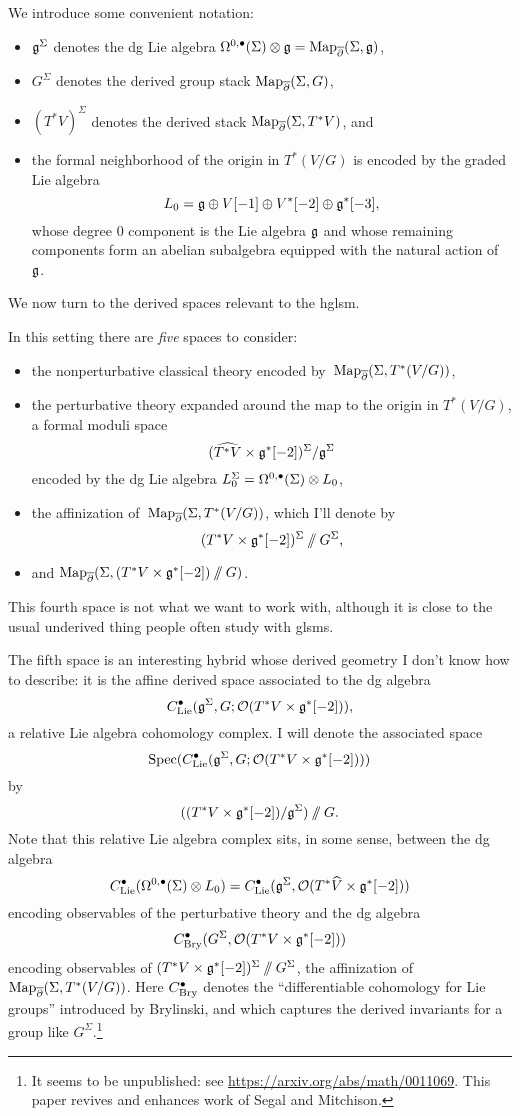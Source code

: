 \documentclass[11pt]{amsart}
\newcommand{\clie}{C^\bu_{\rm Lie}}
\newcommand{\cbry}{C^\bu_{\rm Bry}}
\begin{document}
We introduce some convenient notation:
\begin{itemize}
\item $\mathfrak g^\Sigma$ denotes the dg Lie algebra $\Omega^{0,\bullet}(\Sigma) \otimes \mathfrak g = {\rm Map}_{\overline{\partial}}(\Sigma,\mathfrak g)$,
\item $G^\Sigma$ denotes the derived group stack ${\rm Map}_{\overline{\partial}}(\Sigma,G)$, 
\item $(T^*V)^\Sigma$ denotes the derived stack ${\rm Map}_{\overline{\partial}}(\Sigma,T^*V)$,
and
\item the formal neighborhood of the origin in $T^*(V/G)$ is encoded by the graded Lie algebra
\[
L_0 = \mathfrak g \oplus V[-1] \oplus V^*[-2] \oplus \mathfrak g^*[-3],
\] 
whose degree 0 component is the Lie algebra $\mathfrak g$ and whose remaining components form an abelian subalgebra equipped with the natural action of~$\mathfrak g$.
\end{itemize}
We now turn to the derived spaces relevant to the hglsm.

In this setting there are {\em five} spaces to consider:
\begin{itemize}
\item the nonperturbative classical theory encoded by~${\rm Map}_{\overline{\partial}}(\Sigma, T^*(V/G))$,
\item the perturbative theory expanded around the map to the origin in $T^*(V/G)$, 
a formal moduli space 
\[
(\widehat{T^* V} \times \mathfrak g^*[-2])^\Sigma/\mathfrak g^\Sigma
\] 
encoded by the dg Lie algebra $L_0^\Sigma = \Omega^{0,\bullet}(\Sigma) \otimes L_0$, 
\item the affinization of~${\rm Map}_{\overline{\partial}}(\Sigma, T^*(V/G))$, which I'll denote by 
\[
(T^*V \times \mathfrak g^*[-2])^\Sigma \mathbin{/\mkern-6mu/} G^\Sigma,
\]
\item and ${\rm Map}_{\overline{\partial}}(\Sigma,(T^*V \times \mathfrak g^*[-2])\mathbin{/\mkern-6mu/} G)$.
\end{itemize}
This fourth space is not what we want to work with, 
although it is close to the usual underived thing people often study with glsms.

The fifth space is an interesting hybrid whose derived geometry I don't know how to describe:
it is the affine derived space associated to the dg algebra
\[
\clie(\fg^\Sigma, G; \cO(T^* V \times \fg^*[-2])),
\]
a relative Lie algebra cohomology complex. 
I will denote the associated space
\[
\Spec(\clie(\fg^\Sigma, G; \cO(T^* V \times \fg^*[-2])))
\]
by
\[
((T^* V \times \mathfrak g^*[-2])/\mathfrak g^\Sigma)\mathbin{/\mkern-6mu/} G.
\]
Note that this relative Lie algebra complex sits, in some sense, between the dg algebra
\[
\clie(\Omega^{0,\bu}(\Sigma) \otimes L_0) = \clie(\fg^\Sigma, \cO(T^*\widehat{V} \times \fg^*[-2]))
\]
encoding observables of the perturbative theory
and the dg algebra
\[
\cbry(G^\Sigma, \cO(T^* V \times \fg^*[-2]))
\]
encoding observables of $(T^*V \times \mathfrak g^*[-2])^\Sigma \mathbin{/\mkern-6mu/} G^\Sigma$,
the affinization of~${\rm Map}_{\overline{\partial}}(\Sigma, T^*(V/G))$.
Here $\cbry$ denotes the ``differentiable cohomology for Lie groups'' introduced by Brylinski, 
and which captures the derived invariants for a group like $G^\Sigma$.\footnote{It seems to be unpublished: see \url{https://arxiv.org/abs/math/0011069}. This paper revives and enhances work of Segal and Mitchison.}
\end{document}
